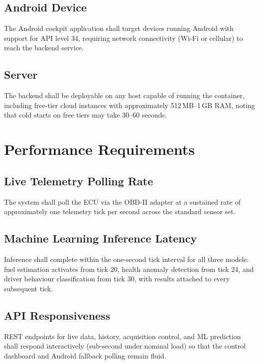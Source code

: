 \documentclass[10pt,a4paper]{report}
\begin{document}
\subsection{Android Device}
The Android cockpit application shall target devices running Android with support for API level 34, requiring network connectivity (Wi-Fi or cellular) to reach the backend service. \par

\subsection{Server}
The backend shall be deployable on any host capable of running the container, including free-tier cloud instances with approximately 512\,MB–1\,GB RAM, noting that cold starts on free tiers may take 30–60 seconds. \par

\section{Performance Requirements}

\subsection{Live Telemetry Polling Rate}
The system shall poll the ECU via the OBD-II adapter at a sustained rate of approximately one telemetry tick per second across the standard sensor set. \par

\subsection{Machine Learning Inference Latency}
Inference shall complete within the one-second tick interval for all three models: fuel estimation activates from tick 20, health anomaly detection from tick 24, and driver behaviour classification from tick 30, with results attached to every subsequent tick. \par

\subsection{API Responsiveness}
REST endpoints for live data, history, acquisition control, and ML prediction shall respond interactively (sub-second under nominal load) so that the control dashboard and Android fallback polling remain fluid. \par
\end{document}
